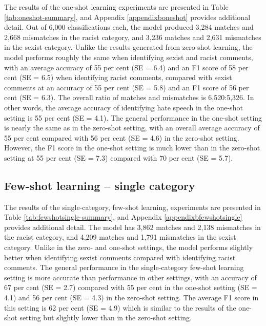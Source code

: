 \documentclass{bmcart}
\begin{document}
The results of the one-shot learning experiments are presented in Table \ref{tab:oneshot-summary}, and Appendix \ref{appendixboneshot} provides additional detail. Out of 6,000 classifications each, the model produced 3,284 matches and 2,668 mismatches in the racist category, and 3,236 matches and 2,631 mismatches in the sexist category. Unlike the results generated from zero-shot learning, the model performs roughly the same when identifying sexist and racist comments, with an average accuracy of 55 per cent (SE = 6.4) and an F1 score of 58 per cent (SE = 6.5) when identifying racist comments, compared with sexist comments at an accuracy of 55 per cent (SE = 5.8) and an F1 score of 56 per cent (SE = 6.3). The overall ratio of matches and mismatches is 6,520:5,326. In other words, the average accuracy of identifying hate speech in the one-shot setting is 55 per cent (SE = 4.1). The general performance in the one-shot setting is nearly the same as in the zero-shot setting, with an overall average accuracy of 55 per cent compared with 56 per cent (SE = 4.6) in the zero-shot setting. However, the F1 score in the one-shot setting is much lower than in the zero-shot setting at 55 per cent (SE = 7.3) compared with 70 per cent (SE = 5.7).



\subsection{Few-shot learning -- single category}\label{few-shot-learning-single-category}

The results of the single-category, few-shot learning, experiments are presented in Table \ref{tab:fewshotsingle-summary}, and Appendix \ref{appendixbfewshotsingle} provides additional detail. The model has 3,862 matches and 2,138 mismatches in the racist category, and 4,209 matches and 1,791 mismatches in the sexist category. Unlike in the zero- and one-shot settings, the model performs slightly better when identifying sexist comments compared with identifying racist comments. The general performance in the single-category few-shot learning setting is more accurate than performance in other settings, with an accuracy of 67 per cent (SE = 2.7) compared with 55 per cent in the one-shot setting (SE = 4.1) and 56 per cent (SE = 4.3) in the zero-shot setting. The average F1 score in this setting is 62 per cent (SE = 4.9) which is similar to the results of the one-shot setting but slightly lower than in the zero-shot setting.
\end{document}
